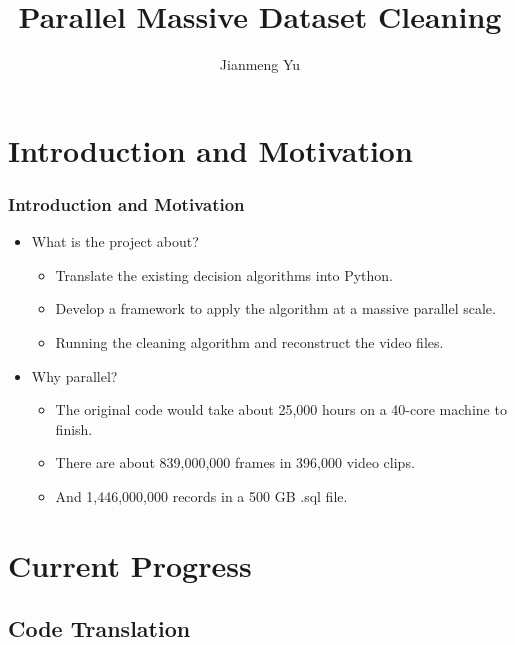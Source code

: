 \documentclass{beamer}[fullspacing]
\begin{document}
\title{Parallel Massive Dataset Cleaning}
\author{Jianmeng Yu}
\date{}


\begin{frame}
\titlepage
\end{frame}


\begin{frame}
\tableofcontents
\end{frame}


\section{Introduction and Motivation}

\begin{frame}
\frametitle{Introduction and Motivation}

\begin{itemize}
\item What is the project about?
\begin{itemize}
\item Translate the existing decision algorithms into Python.
\item Develop a framework to apply the algorithm at a massive parallel scale.
\item Running the cleaning algorithm and reconstruct the video files.
\end{itemize}
\item Why parallel?
\begin{itemize}
\item The original code would take about 25,000 hours on a 40-core machine to finish.
\item There are about 839,000,000 frames in 396,000 video clips.
\item And 1,446,000,000 records in a 500 GB .sql file.
\end{itemize}
\end{itemize}

\end{frame}

\section{Current Progress}
\subsection{Code Translation}
\end{document}

